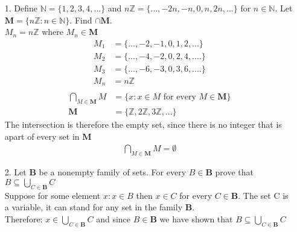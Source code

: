 \documentclass[a4paper,12pt]{article}
\begin{document}
    \begin{itemize}
      \item[1.] Define $\mathbb{N} = \{1, 2, 3, 4, ...\}$ and $n\mathbb{Z}=\{..., -2n, -n, 0, n, 2n, ...\}$ for $n \in \mathbb{N}$. Let $\mathbf{M} = \{n \mathbb{Z} : n \in \mathbb{N}\}$. Find $\cap \mathbf{M}$.
      \\
      $M_n = n\mathbb{Z}$ where $M_n \in \mathbf{M}$
      \\
      \begin{align*}
        M_1 &= \{..., -2, -1, 0, 1, 2, ...\}\\
        M_2 &= \{..., -4, -2, 0, 2, 4, ....\}\\
        M_3 &= \{..., -6, -3, 0, 3, 6, ....\}\\
        M_n &= n\mathbb{Z}\\
      \end{align*}
      \begin{align*}
        \bigcap_{M \in \mathbf{M}} M &= {\{ x : x \in M \text{ for every } M \in \mathbf{M}\}}\\
        \mathbf{M} &= \{\mathbb{Z}, 2\mathbb{Z}, 3\mathbb{Z}, ...\}
      \end{align*}
      The intersection is therefore the empty set, since there is no integer that is apart of every set in $\mathbf{M}$
      \begin{align*}
        \bigcap_{M \in \mathbf{M}}M = \emptyset
      \end{align*}
      \item[2.] Let $\mathbf{B}$ be a nonempty family of sets. For every $B \in \mathbf{B}$ prove that $B \subseteq \bigcup_{C \in \mathbf{B}}C$
      \\
      Suppose for some element $x :x \in B$ then $x \in C$ for every $C \in \mathbf{B}$. The set C is a variable, it can stand for any set in the family $\mathbf{B}$.
      \\
      Therefore: $x\in \bigcup_{C\in \mathbf{B}}C$ and since $B \in \mathbf{B}$ we have shown that $B \subseteq \bigcup_{C\in \mathbf{B}} C$
    \end{itemize} 
\end{document}

